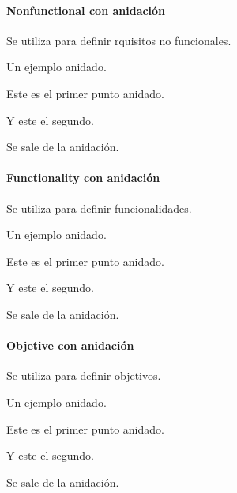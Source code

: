 \paragraph{Nonfunctional con anidación}

Se utiliza para definir rquisitos no funcionales.

\begin{nonfunctional}
        \item Un ejemplo anidado.
        \begin{nonfunctional}
                \item Este es el primer punto anidado.
                \item Y este el segundo.
        \end{nonfunctional}
        \item Se sale de la anidación.
\end{nonfunctional}


\paragraph{Functionality con anidación}

Se utiliza para definir funcionalidades.

\begin{functionality}
        \item Un ejemplo anidado.
        \begin{functionality}
                \item Este es el primer punto anidado.
                \item Y este el segundo.
        \end{functionality}
        \item Se sale de la anidación.
\end{functionality}


\paragraph{Objetive con anidación}

Se utiliza para definir objetivos.

\begin{objetive}
        \item Un ejemplo anidado.
        \begin{objetive}
                \item Este es el primer punto anidado.
                \item Y este el segundo.
        \end{objetive}
        \item Se sale de la anidación.
\end{objetive}
